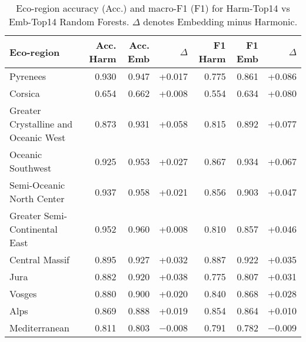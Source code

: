 \documentclass[utf8]{FrontiersinHarvard}
\begin{document}
\begin{table}[H] %
\centering
\begin{tabular}{lrrrrrr}
\toprule %
\textbf{Eco-region} & \textbf{Acc. Harm} & \textbf{Acc. Emb} & $\Delta$ & \textbf{F1 Harm} & \textbf{F1 Emb} & $\Delta$ \\ \midrule
Pyrenees & 0.930 & 0.947 & +0.017 & 0.775 & 0.861 & +0.086 \\
Corsica & 0.654 & 0.662 & +0.008 & 0.554 & 0.634 & +0.080 \\
Greater Crystalline and Oceanic West & 0.873 & 0.931 & +0.058 & 0.815 & 0.892 & +0.077 \\
Oceanic Southwest & 0.925 & 0.953 & +0.027 & 0.867 & 0.934 & +0.067 \\
Semi-Oceanic North Center & 0.937 & 0.958 & +0.021 & 0.856 & 0.903 & +0.047 \\
Greater Semi-Continental East & 0.952 & 0.960 & +0.008 & 0.810 & 0.857 & +0.046 \\
Central Massif & 0.895 & 0.927 & +0.032 & 0.887 & 0.922 & +0.035 \\
Jura & 0.882 & 0.920 & +0.038 & 0.775 & 0.807 & +0.031 \\
Vosges & 0.880 & 0.900 & +0.020 & 0.840 & 0.868 & +0.028 \\
Alps & 0.869 & 0.888 & +0.019 & 0.854 & 0.864 & +0.010 \\
Mediterranean & 0.811 & 0.803 & $-$0.008 & 0.791 & 0.782 & $-$0.009 \\\bottomrule
\end{tabular}
\caption{Eco-region accuracy (Acc.) and macro-F1 (F1) for Harm-Top14 vs Emb-Top14 Random Forests. $\Delta$ denotes Embedding minus Harmonic.}
\label{tab:eco_region_performance}
\end{table}
\end{document}
